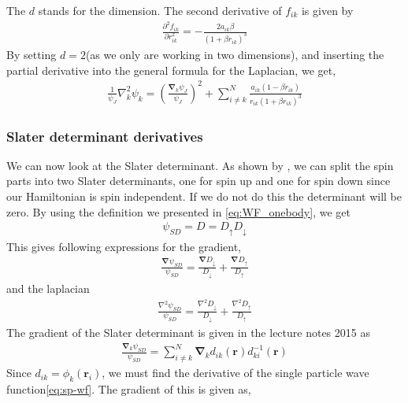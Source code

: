 \documentclass[11pt]{article}
\begin{document}
The $d$ stands for the dimension. The second derivative of $f_{ik}$ is given by
\begin{align}
	\frac{\partial^2f_{ik}}{\partial r_{ik}^2} = -\frac{2a_{ik}\beta}{(1 + \beta r_{ik})^3}
	\label{eq:jastrow-f-second-derivative}
\end{align}
By setting $d=2$(as we only are working in two dimensions), and inserting the partial derivative into the general formula for the Laplacian, we get,
\begin{align}
	\frac{1}{\psi_J}\nabla_k^2 \psi_k = \left( \frac{\bm{\nabla}_k \psi_J}{\psi_J} \right)^2 + \sum_{i\neq k}^N \frac{a_{ik}(1-\beta r_{ik})}{r_{ik}(1+\beta r_{ik})^3}
	\label{eq:n-body-jastrow-lap}
\end{align}

\subsubsection{Slater determinant derivatives}
We can now look at the Slater determinant. As shown by \citet{QUA:QUA560200508}, we can split the spin parts into two Slater determinants, one for spin up and one for spin down since our Hamiltonian is spin independent. If we do not do this the determinant will be zero. By using the definition we presented in \eqref{eq:WF_onebody}, we get
\begin{align}
	\psi_{SD} = D = D_{\uparrow}D_{\downarrow}
	\label{eq:slater-det-spin-up-down}
\end{align}
This gives following expressions for the gradient,
\begin{align}
	\frac{\bm{\nabla}\psi_{SD}}{\psi_{SD}} = \frac{\bm{\nabla}D_{\downarrow}}{D_{\downarrow}} + \frac{\bm{\nabla}D_{\uparrow}}{D_{\uparrow}}
	\label{eq:slater-gradient-spin-down-up-grad}
\end{align}
and the laplacian
\begin{align}
	\frac{{\nabla}^2\psi_{SD}}{\psi_{SD}} = \frac{{\nabla}^2D_{\downarrow}}{D_{\downarrow}} + \frac{{\nabla}^2D_{\uparrow}}{D_{\uparrow}}
	\label{eq:slater-laplacian-spin-down-up-lap}
\end{align}
The gradient of the Slater determinant is given in the lecture notes 2015 \cite{komp2015} as
\begin{align}
	\frac{\bm{\nabla}_k\psi_{SD}}{\psi_{SD}} = \sum_{i\neq k}^N\bm{\nabla}_k d_{ik}(\mathbf{r})d_{ki}^{-1}(\mathbf{r})
	\label{eq:gradient-slater}
\end{align}
Since $d_{ik}=\phi_k (\mathbf{r}_i)$, we must find the derivative of the single particle wave function\eqref{eq:sp-wf}. The gradient of this is given as,
\end{document}
